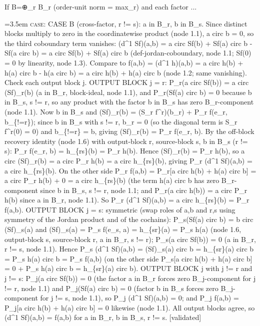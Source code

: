 \documentclass{article}
\newcommand{\step}[1]{\par\noindent\hangindent=3.5em\hangafter=1%
  \makebox[3.5em][l]{\textbf{#1.}}}
\newcommand{\steptag}[1]{\hfill{\small\textsf{[#1]}}}
\begin{document}
\begin{proofbox}{If B=⊕\_r B\_r (order-unit norm = max\_r) and each factor ...}
\step{1.7.2} \textsc{case}: CASE B (cross-factor, r != s): a in B\_r, b in B\_s. Since distinct blocks multiply to zero in the coordinatewise product (node 1.1), a circ b = 0, so the third coboundary term vanishes: (d\textasciicircum{}1 Sf)(a,b) = a circ Sf(b) + Sf(a) circ b - Sf(a circ b) = a circ Sf(b) + Sf(a) circ b (def-jordan-coboundary, node 1.1; Sf(0) = 0 by linearity, node 1.3). Compare to f(a,b) = (d\textasciicircum{}1 h)(a,b) = a circ h(b) + h(a) circ b - h(a circ b) = a circ h(b) + h(a) circ b (node 1.2; same vanishing). Check each output block j. OUTPUT BLOCK j = r: P\_r(a circ Sf(b)) = a circ (Sf)\_r(b) (a in B\_r, block-ideal, node 1.1), and P\_r(Sf(a) circ b) = 0 because b in B\_s, s != r, so any product with the factor b in B\_s has zero B\_r-component (node 1.1). Now b in B\_s and (Sf)\_r(b) = (S\_r f\textasciicircum{}r)(b\_r) + P\_r f(e\_r, b\_\{!=r\}); since b in B\_s with s != r, b\_r = 0 (so the diagonal term is S\_r f\textasciicircum{}r(0) = 0) and b\_\{!=r\} = b, giving (Sf)\_r(b) = P\_r f(e\_r, b). By the off-block recovery identity (node 1.6) with output-block r, source-block s, b in B\_s (r != s): P\_r f(e\_r, b) = h\_\{rs\}(b) = P\_r h(b). Hence (Sf)\_r(b) = P\_r h(b), so a circ (Sf)\_r(b) = a circ P\_r h(b) = a circ h\_\{rs\}(b), giving P\_r (d\textasciicircum{}1 Sf)(a,b) = a circ h\_\{rs\}(b). On the other side P\_r f(a,b) = P\_r[a circ h(b) + h(a) circ b] = a circ P\_r h(b) + 0 = a circ h\_\{rs\}(b) (the term h(a) circ b has zero B\_r-component since b in B\_s, s != r, node 1.1; and P\_r(a circ h(b)) = a circ P\_r h(b) since a in B\_r, node 1.1). So P\_r (d\textasciicircum{}1 Sf)(a,b) = a circ h\_\{rs\}(b) = P\_r f(a,b). OUTPUT BLOCK j = s: symmetric (swap roles of a,b and r,s using symmetry of the Jordan product and of the cochains): P\_s(Sf(a) circ b) = b circ (Sf)\_s(a) and (Sf)\_s(a) = P\_s f(e\_s, a) = h\_\{sr\}(a) = P\_s h(a) (node 1.6, output-block s, source-block r, a in B\_r, s != r); P\_s(a circ Sf(b)) = 0 (a in B\_r, r != s, node 1.1). Hence P\_s (d\textasciicircum{}1 Sf)(a,b) = (Sf)\_s(a) circ b = h\_\{sr\}(a) circ b = P\_s h(a) circ b = P\_s f(a,b) (on the other side P\_s[a circ h(b) + h(a) circ b] = 0 + P\_s h(a) circ b = h\_\{sr\}(a) circ b). OUTPUT BLOCK j with j != r and j != s: P\_j(a circ Sf(b)) = 0 (the factor a in B\_r forces zero B\_j-component for j != r, node 1.1) and P\_j(Sf(a) circ b) = 0 (factor b in B\_s forces zero B\_j-component for j != s, node 1.1), so P\_j (d\textasciicircum{}1 Sf)(a,b) = 0; and P\_j f(a,b) = P\_j[a circ h(b) + h(a) circ b] = 0 likewise (node 1.1). All output blocks agree, so (d\textasciicircum{}1 Sf)(a,b) = f(a,b) for a in B\_r, b in B\_s, r != s. \steptag{validated} \\[4pt]
\end{proofbox}
\end{document}
